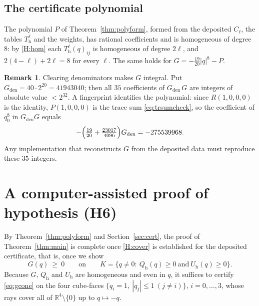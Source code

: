 \documentclass[reqno]{amsart}
\theoremstyle{definition}
\newtheorem{remark}[theorem]{Remark}
\newcommand{\R}{\mathbb{R}}
\begin{document}
\subsection{The certificate polynomial}\label{subsec:P}

The polynomial $P$ of Theorem~\ref{thm:polyform}, formed from the deposited $C_\ell$, the tables
$T^\ell_{\mathrm h}$ and the weights, has rational coefficients and is homogeneous of degree $8$:
by \ref{H:hom} each $T^\ell_{\mathrm h}(q)_{ij}$ is homogeneous of degree $2\ell$, and
$2(4-\ell)+2\ell=8$ for every $\ell$. The same holds for $G=-\tfrac{19}{20}|q|^8-P$.

\begin{remark}\label{rem:deposited}
Clearing denominators makes $G$ integral. Put $G_{\mathrm{den}}=40\cdot2^{20}=41943040$; then all
$35$ coefficients of $G_{\mathrm{den}}\,G$ are integers of absolute value $<2^{32}$. A fingerprint
identifies the polynomial: since $R(1,0,0,0)$ is the identity, $P(1,0,0,0)$ is the trace sum
\eqref{eq:trsumcheck}, so the coefficient of $q_0^{8}$ in $G_{\mathrm{den}}G$ equals
\[
-\Bigl(\tfrac{19}{20}+\tfrac{23017}{4096}\Bigr)G_{\mathrm{den}}=-275539968 .
\]
Any implementation that reconstructs $G$ from the deposited data must reproduce these $35$
integers.
\end{remark}


 
\section{A computer-assisted proof of hypothesis (H6)}\label{sec:cover}

By Theorem~\ref{thm:polyform} and Section~\ref{sec:cert}, the proof of Theorem~\ref{thm:main} is
complete once \ref{H:cover} is established for the deposited certificate, that is, once we show
\begin{equation}\label{eq:gcone}
G(q)\ \ge\ 0\qquad\text{on}\qquad
K=\{q\ne0:\ Q_{\mathrm h}(q)\ge0\ \text{and}\ U_{\mathrm h}(q)\ge0\}.
\end{equation}
Because $G$, $Q_{\mathrm h}$ and $U_{\mathrm h}$ are homogeneous and even in
$q$, it suffices to certify \eqref{eq:gcone} on the four cube-faces
$\{q_i=1,\ |q_j|\le1\ (j\ne i)\}$, $i=0,\dots,3$, whose rays cover all of $\R^4\setminus\{0\}$ up
to $q\mapsto-q$.
\end{document}
